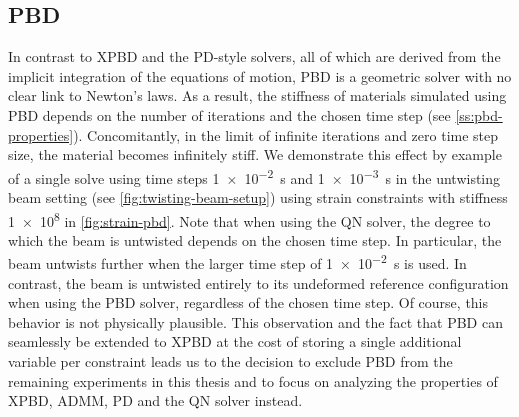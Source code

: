 \subsection{PBD}
In contrast to XPBD and the PD-style solvers, all of which are derived from the implicit integration of the equations of motion, PBD is a geometric solver with no 
clear link to Newton's laws. As a result, the stiffness of materials simulated using PBD depends on the number of iterations and the 
chosen time step (see \cref{ss:pbd-properties}). Concomitantly, in the limit of infinite iterations and zero time step size, the material becomes infinitely stiff. 
We demonstrate this effect by example of a single solve using time steps \SI{1e-2}{\second} and \SI{1e-3}{\second} in the 
untwisting beam setting (see \cref{fig:twisting-beam-setup}) using strain constraints with stiffness \num{1e8} in \autoref{fig:strain-pbd}. Note that when using the QN 
solver, the degree to which the beam is untwisted depends on the chosen time step. In particular, the beam untwists further when the larger time step of \SI{1e-2}{\second} 
is used. In contrast, the beam is untwisted entirely to its undeformed reference configuration when using the PBD solver, regardless of the chosen time step. Of course, this 
behavior is not physically plausible. This observation and the fact that PBD can seamlessly be extended to XPBD at the cost of storing a single additional variable per 
constraint leads us to the decision to exclude PBD from the remaining experiments in this thesis and to focus on analyzing the properties of XPBD, ADMM, PD and the QN solver 
instead.

